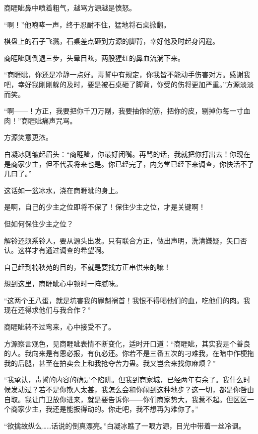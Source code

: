 
\begin{this_body}

商睚眦鼻中喷着粗气，越骂方源越是愤怒。

“啊！”他咆哮一声，终于忍耐不住，猛地将石桌掀翻。

棋盘上的石子飞溅，石桌差点砸到方源的脚背，幸好他及时起身闪避。

商睚眦则倒退三步，头晕目眩，两股猩红的鼻血流淌下来。

“商睚眦，你还是冷静一点好。毒誓中有规定，你我皆不能动手伤害对方。感谢我吧，幸好我刚刚躲的及时，要是被石桌砸了脚背，你受的伤将更加严重。”方源淡淡而笑。

“啊——！方正，我要把你千刀万剐，我要抽你的筋，把你的皮，剔掉你每一寸血肉！”商睚眦痛声咒骂。

方源笑意更浓。

白凝冰则皱起眉头：“商睚眦，你最好闭嘴。再骂的话，我就把你打出去！你现在是商家少主，但不代表将来也是。你已经完了，内务堂已经下来调查，你快活不了几曰了。”

这话如一盆冰水，浇在商睚眦的身上。

是啊，自己的少主之位即将不保了！保住少主之位，才是关键啊！

但如何保住少主之位？

解铃还须系铃人，要从源头出发。只有联合方正，做出声明，洗清嫌疑，矢口否认。这样才有通过调查的希望啊。

自己赶到楠秋苑的目的，不就是要找方正串供来的嘛！

想到这里，商睚眦心中顿时一阵腻味。

“这两个王八蛋，就是坑害我的罪魁祸首！我恨不得喝他们的血，吃他们的肉。我现在还得求他们与我合作？”

商睚眦转不过弯来，心中接受不了。

方源察言观色，见商睚眦表情不断变化，适时开口道：“商睚眦，其实我是个善良的人。我向来是有恩必报，有仇必还。你若不是三番五次的刁难我，在暗中作梗拖我的后腿，甚至在拍卖会上和我抢夺苦力蛊。我又岂会来找你麻烦？”

“我承认，毒誓的内容的确是个陷阱。但我到商家城，已经两年有余了。我什么时候发动过？若不是你欺人太甚，我怎么会和你闹到这种地步？这一切，都是你咎由自取。我让门卫放你进来，就是要告诉你——你们商家势大，我惹不起。但区区一个商家少主，我还是能扳得动的。你走吧，我不想再为难你了。”

“欲擒故纵么……话说的倒真漂亮。”白凝冰瞧了一眼方源，目光中带着一丝冷讽。


\end{this_body}
